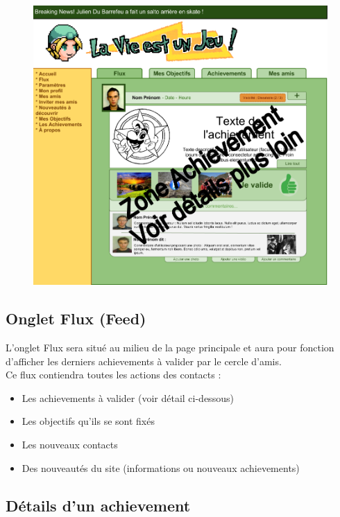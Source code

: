 \documentclass{life-fr}
\begin{document}
\begin{figure}[H]
  \begin{center}
    \includegraphics[width=15cm]{img/accueil.png}
  \end{center}
\end{figure}


\subsection{Onglet Flux (Feed)}

L'onglet Flux sera situé au milieu de la page principale et aura pour fonction d'afficher les derniers achievements à valider par le cercle d'amis.\\

Ce flux contiendra toutes les actions des contacts :

\begin{itemize}
  \item Les achievements à valider (voir détail ci-dessous)
  \item Les objectifs qu'ils se sont fixés
  \item Les nouveaux contacts
  \item Des nouveautés du site (informations ou nouveaux achievements)
\end{itemize}

\subsection{Détails d'un achievement}
\end{document}
